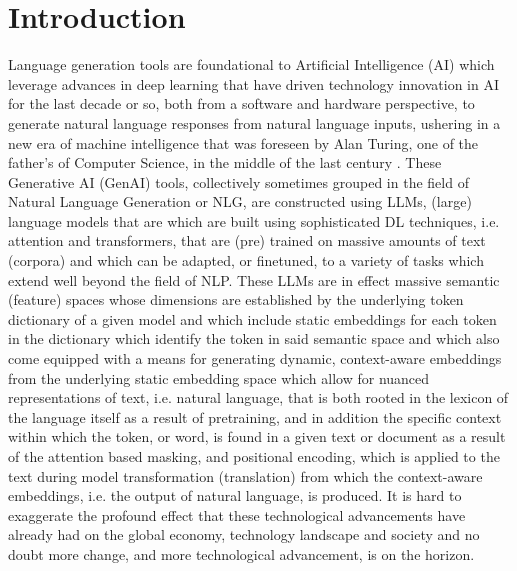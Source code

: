 \documentclass[final]{clv2025}
\begin{document}
\begin{abstract}
performance, comes at a (GPU) computational cost increase of some 4398.07$\%$ compared to the static embedding DL approaches we test - CNN, LSTM and ATTN based DL classifiers, following \cite{moreo} - and a 4126.02$\%$ increase in computation time relative to our ML classifiers that we benchmark. In short, the data and findings which we produce within the context of this research should give pause to researchers and practitioners alike to make sure that the performance gains they expect to achieve by using the bigger and more advanced language models (LLMs) are indeed worth the additional cost in terms of time and computational resources necessary to achieve said gains.
\end{abstract}

\section{Introduction}

Language generation tools are foundational to Artificial Intelligence (AI) which leverage advances in deep learning that have driven technology innovation in AI for the last decade or so, both from a software and hardware perspective, to generate natural language responses from natural language inputs, ushering in a new era of machine intelligence that was foreseen by Alan Turing, one of the father's of Computer Science, in the middle of the last century \cite{turingmind1950} \cite{jones2025largelanguagemodelspass}. These Generative AI (GenAI) tools, collectively sometimes grouped in the field of Natural Language Generation or NLG, are constructed using LLMs, (large) language models that are which are built using sophisticated DL techniques, i.e. attention and transformers, that are (pre) trained on massive amounts of text (corpora) and which can be adapted, or finetuned, to a variety of tasks which extend well beyond the field of NLP. These LLMs are in effect massive semantic (feature) spaces whose dimensions are established by the underlying token dictionary of a given model and which include static embeddings for each token in the dictionary which identify the token in said semantic space and which also come equipped with a means for generating dynamic, context-aware embeddings from the underlying static embedding space which allow for nuanced representations of text, i.e. natural language, that is both rooted in the lexicon of the language itself as a result of pretraining, and in addition the specific context within which the token, or word, is found in a given text or document as a result of the attention based masking, and positional encoding, which is applied to the text during model transformation (translation) from which the context-aware embeddings, i.e. the output of natural language, is produced. It is hard to exaggerate the profound effect that these technological advancements have already had on the global economy, technology landscape and society and no doubt more change, and more technological advancement, is on the horizon.
\end{document}
